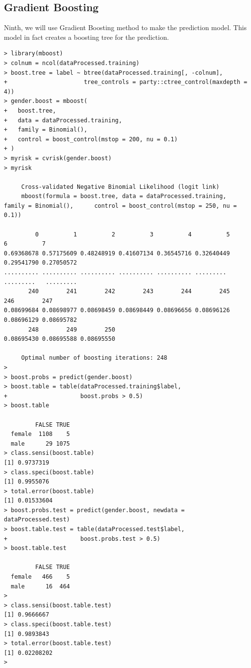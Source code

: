 \documentclass{article}%
\begin{document}
\subsection{Gradient Boosting}
Ninth, we will use Gradient Boosting method to make the prediction model. This model in fact creates a boosting tree for the prediction.
\begin{verbatim}> library(mboost)
> colnum = ncol(dataProcessed.training)
> boost.tree = label ~ btree(dataProcessed.training[, -colnum],
+                      tree_controls = party::ctree_control(maxdepth = 4))
> gender.boost = mboost(
+   boost.tree,
+   data = dataProcessed.training,
+   family = Binomial(),
+   control = boost_control(mstop = 200, nu = 0.1)
+ )
> myrisk = cvrisk(gender.boost)
> myrisk

	 Cross-validated Negative Binomial Likelihood (logit link)
	 mboost(formula = boost.tree, data = dataProcessed.training, family = Binomial(),      control = boost_control(mstop = 250, nu = 0.1))

         0          1          2          3          4          5          6          7
0.69368678 0.57175609 0.48248919 0.41607134 0.36545716 0.32640449 0.29541790 0.27050572
.......... .......... .......... .......... .......... .........  .........   .........
       240        241        242        243        244        245        246        247
0.08699684 0.08698977 0.08698459 0.08698449 0.08696656 0.08696126 0.08696129 0.08695782
       248        249        250
0.08695430 0.08695588 0.08695550

	 Optimal number of boosting iterations: 248 
>
> boost.probs = predict(gender.boost)
> boost.table = table(dataProcessed.training$label,
+                     boost.probs > 0.5)
> boost.table

         FALSE TRUE
  female  1108    5
  male      29 1075
> class.sensi(boost.table)
[1] 0.9737319
> class.speci(boost.table)
[1] 0.9955076
> total.error(boost.table)
[1] 0.01533604
> boost.probs.test = predict(gender.boost, newdata = dataProcessed.test)
> boost.table.test = table(dataProcessed.test$label,
+                     boost.probs.test > 0.5)
> boost.table.test

         FALSE TRUE
  female   466    5
  male      16  464
>
> class.sensi(boost.table.test)
[1] 0.9666667
> class.speci(boost.table.test)
[1] 0.9893843
> total.error(boost.table.test)
[1] 0.02208202
> \end{verbatim}
\end{document}
